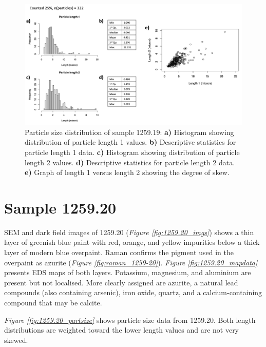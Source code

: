 \begin{figure}[H]
\centering
  \includegraphics[width=\linewidth]{1259-19_partsize}
\caption[Particle size distribution, sample 1259.19.]{Particle size distribution of sample 1259.19: \textbf{a)} Histogram showing distribution of particle length 1 values. \textbf{b)} Descriptive statistics for particle length 1 data. \textbf{c)} Histogram showing distribution of particle length 2 values. \textbf{d)} Descriptive statistics for particle length 2 data. \textbf{e)} Graph of length 1 versus length 2 showing the degree of skew.}
\label{fig:1259.19_partsize}
\end{figure}


\section{Sample 1259.20}

SEM and dark field images of 1259.20 (\textit{Figure \ref{fig:1259.20_imgs}}) shows a thin layer of greenish blue paint with red, orange, and yellow impurities below a thick layer of modern blue overpaint. Raman confirms the pigment used in the overpaint as azurite (\textit{Figure \ref{fig:raman_1259-20}}). \textit{Figure \ref{fig:1259.20_mapdata}} presents EDS maps of both layers. Potassium, magnesium, and aluminium are present but not localised. More clearly assigned are azurite, a natural lead compounds (also containing arsenic), iron oxide, quartz, and a calcium-containing compound that may be calcite.

\textit{Figure \ref{fig:1259.20_partsize}} shows particle size data from 1259.20. Both length distributions are weighted toward the lower length values and are not very skewed.

